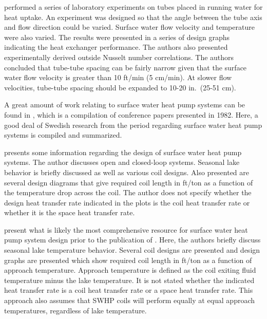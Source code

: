 \cite{SvennsonSorman1983} performed a series of laboratory experiments on tubes placed in running water for heat uptake. An experiment was designed so that the angle between the tube axis and flow direction could be varied. Surface water flow velocity and temperature were also varied. The results were presented in a series of design graphs indicating the heat exchanger performance. The authors also presented experimentally derived outside Nusselt number correlations. The authors concluded that tube-tube spacing can be fairly narrow given that the surface water flow velocity is greater than 10 ft/min (5 cm/min). At slower flow velocities, tube-tube spacing should be expanded to 10-20 in.\ (25-51 cm).

A great amount of work relating to surface water heat pump systems can be found in \cite{BFRseminar1982}, which is a compilation of conference papers presented in 1982. Here, a good deal of Swedish research from the period regarding surface water heat pump systems is compiled and summarized.
	
\cite{Kavanaugh1991} presents some information regarding the design of surface water heat pump systems. The author discusses open and closed-loop systems. Seasonal lake behavior is briefly discussed as well as various coil designs. Also presented are several design diagrams that give required coil length in ft/ton as a function of the temperature drop across the coil. The author does not specify whether the design heat transfer rate indicated in the plots is the coil heat transfer rate or whether it is the space heat transfer rate.

\cite{KavanaughRafferty1997} present what is likely the most comprehensive resource for surface water heat pump system design prior to the publication of \cite{Hansen2011}. Here, the authors briefly discuss seasonal lake temperature behavior. Several coil designs are presented and design graphs are presented which show required coil length in ft/ton as a function of approach temperature. Approach temperature is defined as the coil exiting fluid temperature minus the lake temperature. It is not stated whether the indicated heat transfer rate is a coil heat transfer rate or a space heat transfer rate. This approach also assumes that SWHP coils will perform equally at equal approach temperatures, regardless of lake temperature.

